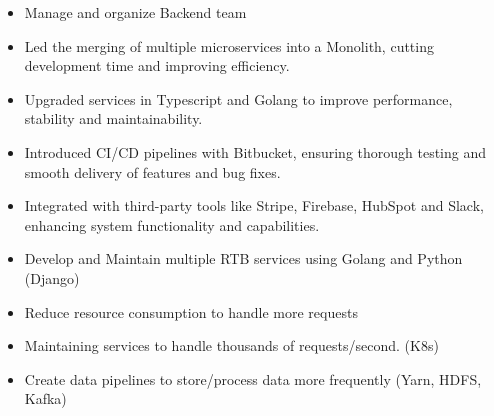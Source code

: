 \documentclass[10pt,a4paper,ragged2e,withhyper]{altacv/altacv}
\begin{document}


\makecvheader
{}


\begin{paracol}{2}


\begin{itemize}
  \item Manage and organize Backend team
\end{itemize}
\divider

\begin{itemize}
  \item Led the merging of multiple microservices into a Monolith, cutting development time and improving efficiency.
  \item Upgraded services in Typescript and Golang to improve performance, stability and maintainability.
  \item Introduced CI/CD pipelines with Bitbucket, ensuring thorough testing and smooth delivery of features and bug fixes.
  \item Integrated with third-party tools like Stripe, Firebase, HubSpot and Slack, enhancing system functionality and capabilities.
\end{itemize}
\divider

\begin{itemize}
  \item Develop and Maintain multiple RTB services using Golang and Python (Django)
  \item Reduce resource consumption to handle more requests
  \item Maintaining services to handle thousands of requests/second. (K8s)
  \item Create data pipelines to store/process data more frequently (Yarn, HDFS, Kafka)
\end{itemize}
\divider


\end{paracol}
\end{document}

